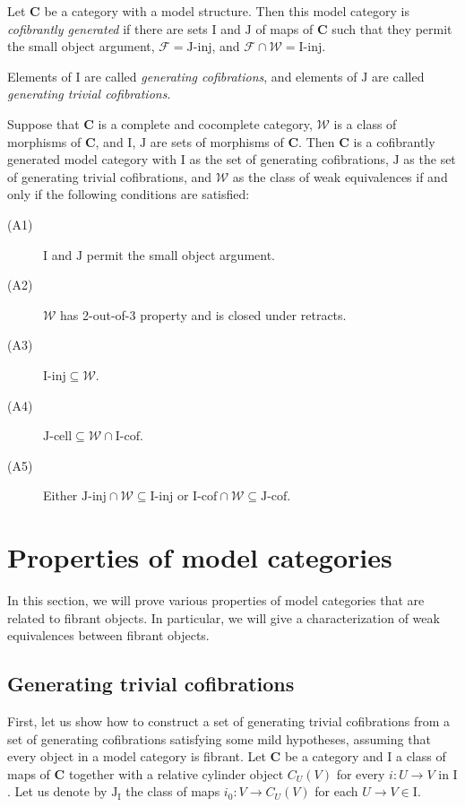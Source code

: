 \documentclass{tac}
\theoremstyle{definition}
\newcommand{\we}{\mathcal{W}}
\newcommand{\fib}{\mathcal{F}}
\newcommand{\cat}[1]{\mathbf{#1}}
\newcommand{\C}{\cat{C}}
\newcommand{\I}{\mathrm{I}}
\newcommand{\J}{\mathrm{J}}
\newcommand{\class}[2]{#1\text{-}\mathrm{#2}}
\newcommand{\Iinj}[1][\I]{\class{#1}{inj}}
\newcommand{\Icell}[1][\I]{\class{#1}{cell}}
\newcommand{\Icof}[1][\I]{\class{#1}{cof}}
\newcommand{\Jinj}[1][]{\Iinj[\J#1]}
\newcommand{\Jcell}[1][]{\Icell[\J#1]}
\newcommand{\Jcof}[1][]{\Icof[\J#1]}
\newcommand{\cyli}{i}
\begin{document}
\begin{defn}
Let $\C$ be a category with a model structure. Then this model category is
\emph{cofibrantly generated} if there are sets $\I$ and $\J$ of maps of $\C$ such
that they permit the small object argument, $\fib = \Jinj$, and $\fib \cap \we = \Iinj$.

Elements of $\I$ are called \emph{generating cofibrations},
and elements of $\J$ are called \emph{generating trivial cofibrations}.
\end{defn}

\begin{prop}
Suppose that $\C$ is a complete and cocomplete category, $\we$ is a class of morphisms of $\C$, and $\I$, $\J$ are sets of morphisms of $\C$.
Then $\C$ is a cofibrantly generated model category with $\I$ as the set of generating cofibrations,
$\J$ as the set of generating trivial cofibrations, and $\we$ as the class of weak equivalences if and only if the following conditions are satisfied:
\begin{description}
\item[(A1)] $\I$ and $\J$ permit the small object argument.
\item[(A2)] $\we$ has 2-out-of-3 property and is closed under retracts.
\item[(A3)] $\Iinj \subseteq \we$.
\item[(A4)] $\Jcell \subseteq \we \cap \Icof$.
\item[(A5)] Either $\Jinj \cap \we \subseteq \Iinj$ or $\Icof \cap \we \subseteq \Jcof$.
\end{description}
\end{prop}

\section{Properties of model categories}

In this section, we will prove various properties of model categories that are related to fibrant objects.
In particular, we will give a characterization of weak equivalences between fibrant objects.

\subsection{Generating trivial cofibrations}

First, let us show how to construct a set of generating trivial cofibrations from a set of generating cofibrations satisfying some mild hypotheses,
assuming that every object in a model category is fibrant.
Let $\C$ be a category and $\I$ a class of maps of $\C$ together with a relative cylinder object $C_U(V)$ for every $i : U \to V$ in $\I$.
Let us denote by $\J_\I$ the class of maps $\cyli_0 : V \to C_U(V)$ for each $U \to V \in \I$.
\end{document}
